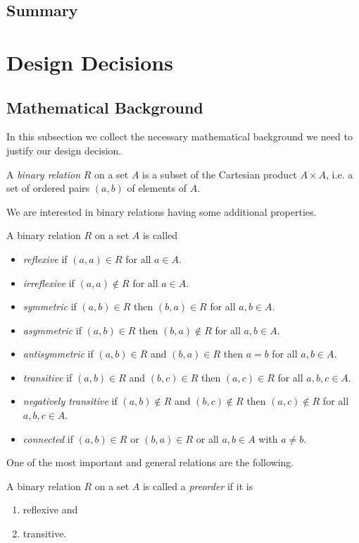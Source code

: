 ﻿\documentclass[a4paper,11pt,final]{article}
\begin{document}
\subsection{Summary}


\section{Design Decisions}
\subsection{Mathematical Background}
In this subsection we collect the necessary mathematical background we need to justify our design decision.

\begin{defi}
A \emph{binary relation} $R$ on a set $A$ is a subset of the Cartesian product $A\times A$, i.e. a set of ordered pairs $(a,b)$ of elements of $A$.
\end{defi}

We are interested in binary relations having some additional properties.
\begin{defi}
A binary relation $R$ on a set $A$ is called
\begin{itemize}
\item \emph{reflexive} if $(a,a)\in R$ for all $a\in A$.
\item \emph{irreflexive} if $(a,a)\notin R$ for all $a\in A$.
\item \emph{symmetric} if $(a,b)\in R$ then $(b,a)\in R$ for all $a,b\in A$.
\item \emph{asymmetric} if $(a,b)\in R$ then $(b,a)\notin R$ for all $a,b\in A$.
\item \emph{antisymmetric} if $(a,b)\in R$ and $(b,a)\in R$ then $a=b$ for all $a,b\in A$.
\item \emph{transitive} if $(a,b)\in R$ and $(b,c)\in R$ then $(a,c)\in R$ for all $a,b,c\in A$.
\item \emph{negatively transitive} if $(a,b)\notin R$ and $(b,c)\notin R$ then $(a,c)\notin R$ for all $a,b,c\in A$.
\item \emph{connected} if $(a,b)\in R$ or $(b,a)\in R$ or all $a,b\in A$ with $a\neq b$.
\end{itemize}
\end{defi}

One of the most important and general relations are the following.
\begin{defi}[Preorder]
A binary relation $R$ on a set $A$ is called a \emph{preorder} if it is
\begin{enumerate}
\item reflexive and
\item transitive.
\end{enumerate}
\end{defi}
\end{document}
